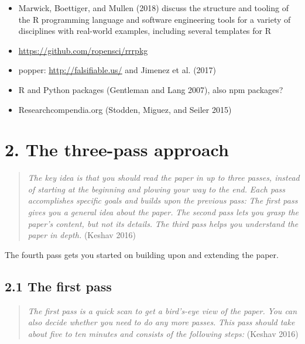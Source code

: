\documentclass[fleqn,10pt]{wlpeerj} %
\providecommand{\tightlist}{
\setlength{\itemsep}{0pt}\setlength{\parskip}{0pt}}
\begin{document}
\begin{itemize}
\tightlist
\item
  Marwick, Boettiger, and Mullen (2018) discuss the structure and
  tooling of the R programming language and software engineering tools
  for a variety of disciplines with real-world examples, including
  several templates for R
\item
  \url{https://github.com/ropensci/rrrpkg}
\item
  popper: \url{http://falsifiable.us/} and Jimenez et al. (2017)
\item
  R and Python packages (Gentleman and Lang 2007), also npm packages?
\item
  Researchcompendia.org (Stodden, Miguez, and Seiler 2015)
\end{itemize}

\section*{2. The three-pass approach}\label{the-three-pass-approach}

\begin{quote}
\emph{The key idea is that you should read the paper in up to three
passes, instead of starting at the beginning and plowing your way to the
end.} \emph{Each pass accomplishes specific goals and builds upon the
previous pass:} \emph{The first pass gives you a general idea about the
paper.} \emph{The second pass lets you grasp the paper's content, but
not its details.} \emph{The third pass helps you understand the paper in
depth.} (Keshav 2016)
\end{quote}

The fourth pass gets you started on building upon and extending the
paper.

\subsection*{2.1 The first pass}\label{the-first-pass}

\begin{quote}
\emph{The first pass is a quick scan to get a bird's-eye view of the
paper.} \emph{You can also decide whether you need to do any more
passes.} \emph{This pass should take about five to ten minutes and
consists of the following steps:} (Keshav 2016)
\end{quote}
\end{document}
